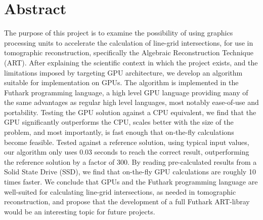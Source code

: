 \thispagestyle{empty}
\section*{Abstract}
The purpose of this project is to examine the possibility of using graphics processing units to accelerate the calculation of line-grid intersections, for use in tomographic reconstruction, specifically the Algebraic Reconstruction Technique (ART). After explaining the scientific context in which the project exists, and the limitations imposed by targeting GPU architecture, we develop an algorithm suitable for implementation on GPUs.
The algorithm is implemented in the Futhark programming language, a high level GPU language providing many of the same advantages as regular high level languages, most notably ease-of-use and portability. Testing the GPU solution against a CPU equivalent, we find that the GPU significantly outperforms the CPU, scales better with the size of the problem, and most importantly, is fast enough that on-the-fly calculations become feasible. Tested against a reference solution, using typical input values, our algorithm only uses 0.03 seconds to reach the correct result, outperforming the reference solution by a factor of 300. By reading pre-calculated results from a Solid State Drive (SSD), we find that on-the-fly GPU calculations are roughly 10 times faster. We conclude that GPUs and the Futhark programming language are well-suited for calculating line-grid intersections, as needed in tomographic reconstruction, and propose that the development of a full Futhark ART-libray would be an interesting topic for future projects. 

